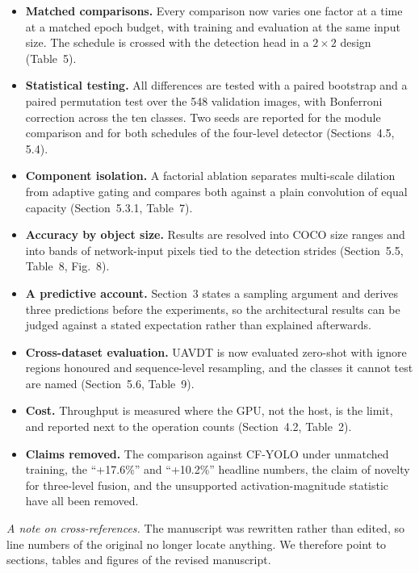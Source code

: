 \documentclass[11pt, a4paper]{article}
\begin{document}
\begin{itemize}[leftmargin=1.3em, itemsep=2pt]
\item \textbf{Matched comparisons.} Every comparison now varies one factor at a
time at a matched epoch budget, with training and evaluation at the same input
size. The schedule is crossed with the detection head in a $2\times2$ design
(Table~5).
\item \textbf{Statistical testing.} All differences are tested with a paired
bootstrap and a paired permutation test over the 548 validation images, with
Bonferroni correction across the ten classes. Two seeds are reported for the
module comparison and for both schedules of the four-level detector
(Sections~4.5, 5.4).
\item \textbf{Component isolation.} A factorial ablation separates multi-scale
dilation from adaptive gating and compares both against a plain convolution of
equal capacity (Section~5.3.1, Table~7).
\item \textbf{Accuracy by object size.} Results are resolved into COCO size
ranges and into bands of network-input pixels tied to the detection strides
(Section~5.5, Table~8, Fig.~8).
\item \textbf{A predictive account.} Section~3 states a sampling argument and
derives three predictions before the experiments, so the architectural results
can be judged against a stated expectation rather than explained afterwards.
\item \textbf{Cross-dataset evaluation.} UAVDT is now evaluated zero-shot with
ignore regions honoured and sequence-level resampling, and the classes it cannot
test are named (Section~5.6, Table~9).
\item \textbf{Cost.} Throughput is measured where the GPU, not the host, is the
limit, and reported next to the operation counts (Section~4.2, Table~2).
\item \textbf{Claims removed.} The comparison against CF-YOLO under unmatched
training, the ``+17.6\%'' and ``+10.2\%'' headline numbers, the claim of novelty
for three-level fusion, and the unsupported activation-magnitude statistic have
all been removed.
\end{itemize}

\textit{A note on cross-references.} The manuscript was rewritten rather than
edited, so line numbers of the original no longer locate anything. We therefore
point to sections, tables and figures of the revised manuscript.

\end{document}
